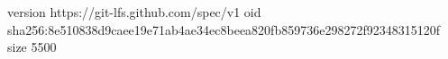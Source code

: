 version https://git-lfs.github.com/spec/v1
oid sha256:8e510838d9caee19e71ab4ae34ec8beea820fb859736e298272f92348315120f
size 5500
